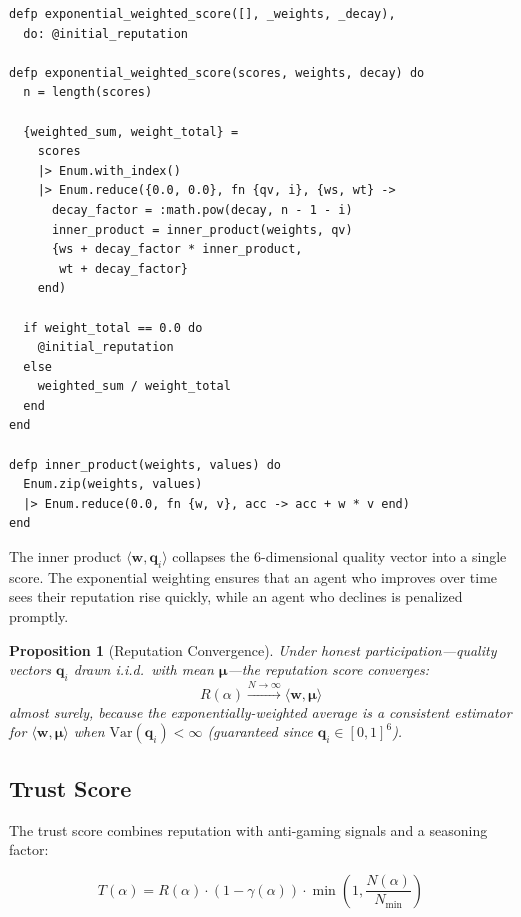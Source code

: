 \documentclass[12pt,a4paper]{article}
\theoremstyle{plain}
\newtheorem{proposition}[theorem]{Proposition}
\theoremstyle{definition}
\begin{document}
\begin{lstlisting}[caption={Exponentially-weighted reputation scoring},label={lst:rep-score}]
defp exponential_weighted_score([], _weights, _decay),
  do: @initial_reputation

defp exponential_weighted_score(scores, weights, decay) do
  n = length(scores)

  {weighted_sum, weight_total} =
    scores
    |> Enum.with_index()
    |> Enum.reduce({0.0, 0.0}, fn {qv, i}, {ws, wt} ->
      decay_factor = :math.pow(decay, n - 1 - i)
      inner_product = inner_product(weights, qv)
      {ws + decay_factor * inner_product,
       wt + decay_factor}
    end)

  if weight_total == 0.0 do
    @initial_reputation
  else
    weighted_sum / weight_total
  end
end

defp inner_product(weights, values) do
  Enum.zip(weights, values)
  |> Enum.reduce(0.0, fn {w, v}, acc -> acc + w * v end)
end
\end{lstlisting}

The inner product $\langle \mathbf{w}, \mathbf{q}_i \rangle$ collapses the 6-dimensional quality vector into a single score. The exponential weighting ensures that an agent who improves over time sees their reputation rise quickly, while an agent who declines is penalized promptly.

\begin{proposition}[Reputation Convergence]\label{prop:rep-convergence}
Under honest participation---quality vectors $\mathbf{q}_i$ drawn i.i.d.\ with mean $\boldsymbol{\mu}$---the reputation score converges:
\[
    R(\alpha) \xrightarrow{N \to \infty} \langle \mathbf{w}, \boldsymbol{\mu} \rangle
\]
almost surely, because the exponentially-weighted average is a consistent estimator for $\langle \mathbf{w}, \boldsymbol{\mu} \rangle$ when $\text{Var}(\mathbf{q}_i) < \infty$ (guaranteed since $\mathbf{q}_i \in [0,1]^6$).
\end{proposition}

\subsection{Trust Score}

The trust score combines reputation with anti-gaming signals and a seasoning factor:

\begin{equation}\label{eq:trust}
    T(\alpha) = R(\alpha) \cdot (1 - \gamma(\alpha)) \cdot \min\left(1, \frac{N(\alpha)}{N_{\min}}\right)
\end{equation}
\end{document}
